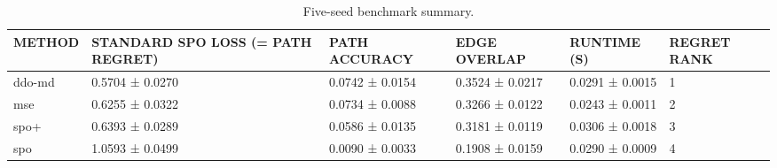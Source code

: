\begin{table}
\caption{Five-seed benchmark summary.}
\label{tab:five-seed-summary}
\begin{tabular}{llllll}
\toprule
METHOD & STANDARD SPO LOSS (= PATH REGRET) & PATH ACCURACY & EDGE OVERLAP & RUNTIME (S) & REGRET RANK \\
\midrule
ddo-md & 0.5704 ± 0.0270 & 0.0742 ± 0.0154 & 0.3524 ± 0.0217 & 0.0291 ± 0.0015 & 1 \\
mse & 0.6255 ± 0.0322 & 0.0734 ± 0.0088 & 0.3266 ± 0.0122 & 0.0243 ± 0.0011 & 2 \\
spo+ & 0.6393 ± 0.0289 & 0.0586 ± 0.0135 & 0.3181 ± 0.0119 & 0.0306 ± 0.0018 & 3 \\
spo & 1.0593 ± 0.0499 & 0.0090 ± 0.0033 & 0.1908 ± 0.0159 & 0.0290 ± 0.0009 & 4 \\
\bottomrule
\end{tabular}
\end{table}
